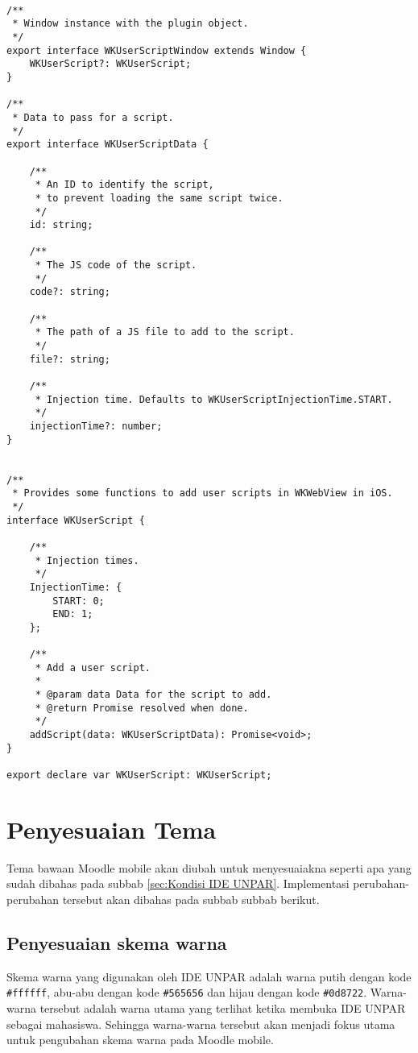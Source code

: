 \begin{lstlisting}[frame=single, label ={index.d.ts}, caption = Perubahan pada \texttt{node\_ modules/cordova-plugin-wkuserscript/types/index.d.ts} ]
	
/**
 * Window instance with the plugin object.
 */
export interface WKUserScriptWindow extends Window {
    WKUserScript?: WKUserScript;
}

/**
 * Data to pass for a script.
 */
export interface WKUserScriptData {

    /**
     * An ID to identify the script, 
     * to prevent loading the same script twice.
     */
    id: string;

    /**
     * The JS code of the script.
     */
    code?: string;

    /**
     * The path of a JS file to add to the script.
     */
    file?: string;

    /**
     * Injection time. Defaults to WKUserScriptInjectionTime.START.
     */
    injectionTime?: number;
}


/**
 * Provides some functions to add user scripts in WKWebView in iOS.
 */
interface WKUserScript {

    /**
     * Injection times.
     */
    InjectionTime: {
        START: 0;
        END: 1;
    };

    /**
     * Add a user script.
     *
     * @param data Data for the script to add.
     * @return Promise resolved when done.
     */
    addScript(data: WKUserScriptData): Promise<void>;
}

export declare var WKUserScript: WKUserScript;

\end{lstlisting}

\section{Penyesuaian Tema}
Tema bawaan Moodle mobile akan diubah untuk menyesuaiakna seperti apa yang sudah dibahas pada subbab \ref{sec:Kondisi IDE UNPAR}. Implementasi perubahan-perubahan tersebut akan dibahas pada subbab subbab berikut.

\subsection{Penyesuaian skema warna}
Skema warna yang digunakan oleh IDE UNPAR adalah warna putih dengan kode \texttt{\#ffffff}, abu-abu dengan kode \texttt{\#565656} dan hijau dengan kode \texttt{\#0d8722}.  Warna-warna tersebut adalah warna utama yang terlihat ketika membuka IDE UNPAR sebagai mahasiswa. Sehingga warna-warna tersebut akan menjadi fokus utama untuk pengubahan skema warna pada Moodle mobile.

